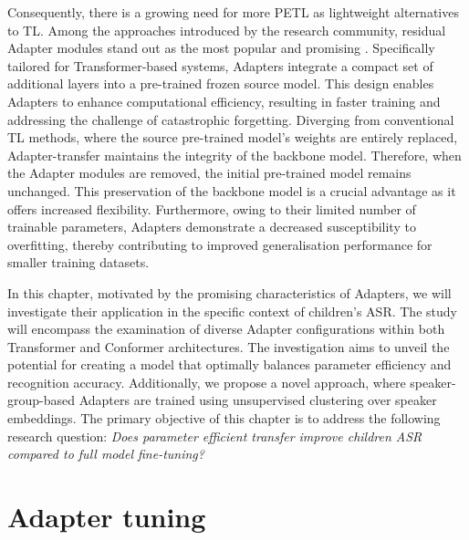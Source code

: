 Consequently, there is a growing need for more \ac{PETL} as lightweight alternatives to \ac{TL}. Among the approaches introduced by the research community, residual Adapter modules stand out as the most popular and promising \cite{houlsby, pfeiffer}. Specifically tailored for Transformer-based systems, Adapters integrate a compact set of additional layers into a pre-trained frozen source model. This design enables Adapters to enhance computational efficiency, resulting in faster training and addressing the challenge of catastrophic forgetting. Diverging from conventional \ac{TL} methods, where the source pre-trained model's weights are entirely replaced, Adapter-transfer maintains the integrity of the backbone model. Therefore, when the Adapter modules are removed, the initial pre-trained model remains unchanged. This preservation of the backbone model is a crucial advantage as it offers increased flexibility. Furthermore, owing to their limited number of trainable parameters, Adapters demonstrate a decreased susceptibility to overfitting, thereby contributing to improved generalisation performance for smaller training datasets.

 In this chapter, motivated by the promising characteristics of Adapters, we will investigate their application in the specific context of children's \ac{ASR}. The study will encompass the examination of diverse Adapter configurations within both Transformer and Conformer architectures. The investigation aims to unveil the potential for creating a model that optimally balances parameter efficiency and recognition accuracy. Additionally, we propose a novel approach, where speaker-group-based Adapters are trained using unsupervised clustering over speaker embeddings.
The primary objective of this chapter is to address the following research question: \textit{Does parameter efficient transfer improve children \ac{ASR} compared to full model fine-tuning?} 

\section{Adapter tuning}


